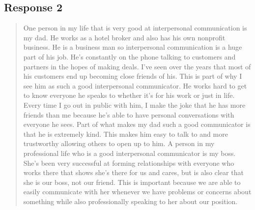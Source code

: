 
\subsection{Response 2}
  \begin{quotation}
    One person in my life that is very good at interpersonal communication is my
      dad. He works as a hotel broker and also has his own nonprofit business.
      He is a business man so interpersonal communication is a huge part of his
      job. He's constantly on the phone talking to customers and partners in
      the hopes of making deals. I've seen over the years that most of his
      customers end up becoming close friends of his. This is part of why I see
      him as such a good interpersonal communicator. He works hard to get to
      know everyone he speaks to whether it's for his work or just in life.
      Every time I go out in public with him, I make the joke that he has more
      friends than me because he's able to have personal conversations with
      everyone he sees. Part of what makes my dad such a good communicator is
      that he is extremely kind. This makes him easy to talk to and more
      trustworthy allowing others to open up to him. A person in my professional
      life who is a good interpersonal communicator is my boss. She's been very
      successful at forming relationships with everyone who works there that
      shows she's there for us and cares, but is also clear that she is our
      boss, not our friend. This is important because we are able to easily
      communicate with her whenever we have problems or concerns about something
      while also professionally speaking to her about our position.


\end{quotation}
